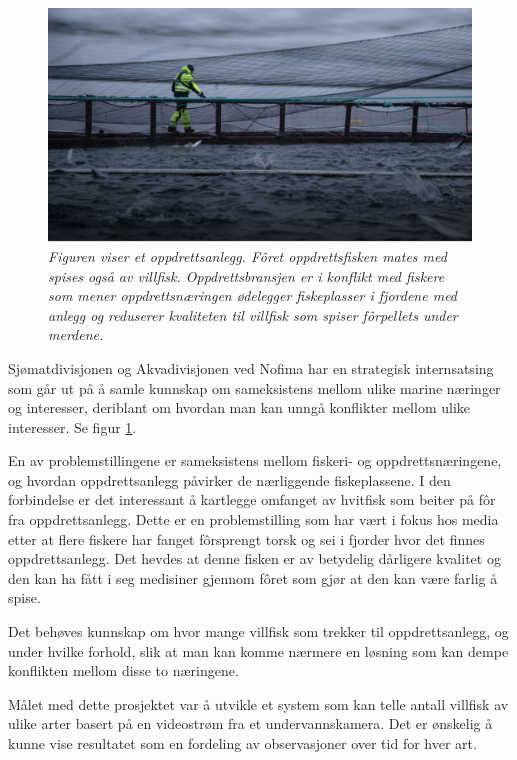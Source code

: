 \begin{figure} 
\begin{center} 
\includegraphics[scale=0.7]{figures/oppdrett}
\caption{\small \sl Figuren viser et oppdrettsanlegg. Fôret oppdrettsfisken mates med spises også av villfisk. Oppdrettsbransjen er i konflikt med fiskere som mener oppdrettsnæringen ødelegger fiskeplasser i fjordene med anlegg og reduserer kvaliteten til villfisk som spiser fôrpellets under merdene. \cite{Olsen m.fl. 2018} \label{fig:anlegg}} 
\end{center} 
\end{figure} 

Sjømatdivisjonen og Akvadivisjonen ved Nofima har en strategisk internsatsing som går ut på å samle kunnskap om sameksistens mellom ulike marine næringer og interesser, deriblant om hvordan man kan unngå konflikter mellom ulike interesser. Se figur \ref{fig:anlegg}. \cite{Robertsen 2020}

En av problemstillingene er sameksistens mellom fiskeri- og oppdrettsnæringene, og hvordan oppdrettsanlegg påvirker de nærliggende fiskeplassene. I den forbindelse er det interessant å kartlegge omfanget av hvitfisk som beiter på fôr fra oppdrettsanlegg. Dette er en problemstilling som har vært i fokus hos media etter at flere fiskere har fanget fôrsprengt torsk og sei i fjorder hvor det finnes oppdrettsanlegg. Det hevdes at denne fisken er av betydelig dårligere kvalitet og den kan ha fått i seg medisiner gjennom fôret som gjør at den kan være farlig å spise. \cite{Olsen 2019}

Det behøves kunnskap om hvor mange villfisk som trekker til oppdrettsanlegg, og under hvilke forhold, slik at man kan komme nærmere en løsning som kan dempe konflikten mellom disse to næringene. 

Målet med dette prosjektet var å utvikle et system som kan telle antall villfisk av ulike arter basert på en videostrøm fra et undervannskamera. Det er ønskelig å kunne vise resultatet som en fordeling av observasjoner over tid for hver art. 

